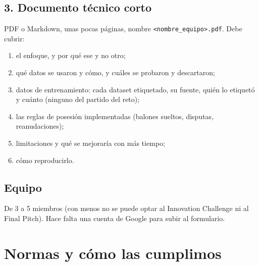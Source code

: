 \documentclass[11pt,a4paper]{article}
\begin{document}
\subsection{3. Documento t\'ecnico corto}
PDF o Markdown, unas pocas p\'aginas, nombre \texttt{<nombre\_equipo>.pdf}. Debe cubrir:
\begin{enumerate}
  \item el enfoque, y por qu\'e ese y no otro;
  \item qu\'e datos se usaron y c\'omo, y cu\'ales se probaron y descartaron;
  \item datos de entrenamiento: cada dataset etiquetado, su fuente, qui\'en lo etiquet\'o y
        cu\'anto (ninguno del partido del reto);
  \item las reglas de posesi\'on implementadas (balones sueltos, disputas, reanudaciones);
  \item limitaciones y qu\'e se mejorar\'ia con m\'as tiempo;
  \item c\'omo reproducirlo.
\end{enumerate}

\subsection{Equipo}
De 3 a 5 miembros (con menos no se puede optar al Innovation Challenge ni al Final Pitch). Hace
falta una cuenta de Google para subir al formulario.

\section{Normas y c\'omo las cumplimos}
\end{document}
